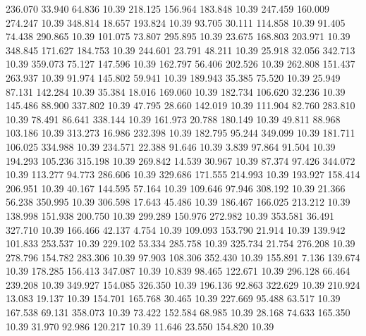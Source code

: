  236.070   33.940   64.836        10.39
 218.125  156.964  183.848        10.39
 247.459  160.009  274.247        10.39
 348.814   18.657  193.824        10.39
  93.705   30.111  114.858        10.39
  91.405   74.438  290.865        10.39
 101.075   73.807  295.895        10.39
  23.675  168.803  203.971        10.39
 348.845  171.627  184.753        10.39
 244.601   23.791   48.211        10.39
  25.918   32.056  342.713        10.39
 359.073   75.127  147.596        10.39
 162.797   56.406  202.526        10.39
 262.808  151.437  263.937        10.39
  91.974  145.802   59.941        10.39
 189.943   35.385   75.520        10.39
  25.949   87.131  142.284        10.39
  35.384   18.016  169.060        10.39
 182.734  106.620   32.236        10.39
 145.486   88.900  337.802        10.39
  47.795   28.660  142.019        10.39
 111.904   82.760  283.810        10.39
  78.491   86.641  338.144        10.39
 161.973   20.788  180.149        10.39
  49.811   88.968  103.186        10.39
 313.273   16.986  232.398        10.39
 182.795   95.244  349.099        10.39
 181.711  106.025  334.988        10.39
 234.571   22.388   91.646        10.39
   3.839   97.864   91.504        10.39
 194.293  105.236  315.198        10.39
 269.842   14.539   30.967        10.39
  87.374   97.426  344.072        10.39
 113.277   94.773  286.606        10.39
 329.686  171.555  214.993        10.39
 193.927  158.414  206.951        10.39
  40.167  144.595   57.164        10.39
 109.646   97.946  308.192        10.39
  21.366   56.238  350.995        10.39
 306.598   17.643   45.486        10.39
 186.467  166.025  213.212        10.39
 138.998  151.938  200.750        10.39
 299.289  150.976  272.982        10.39
 353.581   36.491  327.710        10.39
 166.466   42.137    4.754        10.39
 109.093  153.790   21.914        10.39
 139.942  101.833  253.537        10.39
 229.102   53.334  285.758        10.39
 325.734   21.754  276.208        10.39
 278.796  154.782  283.306        10.39
  97.903  108.306  352.430        10.39
 155.891    7.136  139.674        10.39
 178.285  156.413  347.087        10.39
  10.839   98.465  122.671        10.39
 296.128   66.464  239.208        10.39
 349.927  154.085  326.350        10.39
 196.136   92.863  322.629        10.39
 210.924   13.083   19.137        10.39
 154.701  165.768   30.465        10.39
 227.669   95.488   63.517        10.39
 167.538   69.131  358.073        10.39
  73.422  152.584   68.985        10.39
  28.168   74.633  165.350        10.39
  31.970   92.986  120.217        10.39
  11.646   23.550  154.820        10.39

